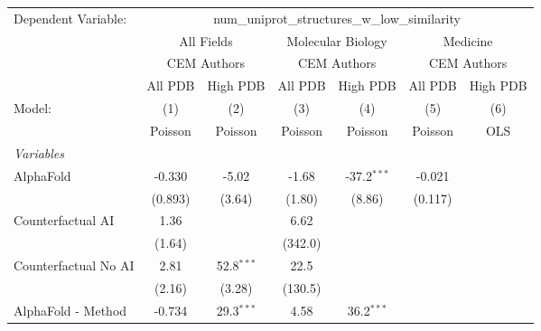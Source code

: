 \begingroup
\centering
\begin{tabular}{lcccccc}
   \tabularnewline \midrule \midrule
   Dependent Variable: & \multicolumn{6}{c}{num\_uniprot\_structures\_w\_low\_similarity}\\
 & \multicolumn{2}{c}{All Fields} & \multicolumn{2}{c}{Molecular Biology} & \multicolumn{2}{c}{Medicine} \\
\cmidrule(lr){2-3} \cmidrule(lr){4-5} \cmidrule(lr){6-7}
 & \multicolumn{2}{c}{CEM Authors} & \multicolumn{2}{c}{CEM Authors} & \multicolumn{2}{c}{CEM Authors} \\
\cmidrule(lr){2-3} \cmidrule(lr){4-5} \cmidrule(lr){6-7}
 & \multicolumn{1}{c}{All PDB} & \multicolumn{1}{c}{High PDB} & \multicolumn{1}{c}{All PDB} & \multicolumn{1}{c}{High PDB} & \multicolumn{1}{c}{All PDB} & \multicolumn{1}{c}{High PDB} \\
\cmidrule(lr){2-2} \cmidrule(lr){3-3} \cmidrule(lr){4-4} \cmidrule(lr){5-5} \cmidrule(lr){6-6} \cmidrule(lr){7-7}
   Model:                                                  & (1)      & (2)          & (3)     & (4)           & (5)     & (6)\\  
                                                           &  Poisson & Poisson      & Poisson & Poisson       & Poisson & OLS\\  
   \midrule
   \emph{Variables}\\
   AlphaFold                                               & -0.330   & -5.02        & -1.68   & -37.2$^{***}$ & -0.021  &   \\   
                                                           & (0.893)  & (3.64)       & (1.80)  & (8.86)        & (0.117) &   \\   
   Counterfactual AI                                       & 1.36     &              & 6.62    &               &         &   \\   
                                                           & (1.64)   &              & (342.0) &               &         &   \\   
   Counterfactual No AI                                    & 2.81     & 52.8$^{***}$ & 22.5    &               &         &   \\   
                                                           & (2.16)   & (3.28)       & (130.5) &               &         &   \\   
   AlphaFold - Method                                      & -0.734   & 29.3$^{***}$ & 4.58    & 36.2$^{***}$  &         &   \\   

\end{tabular}
